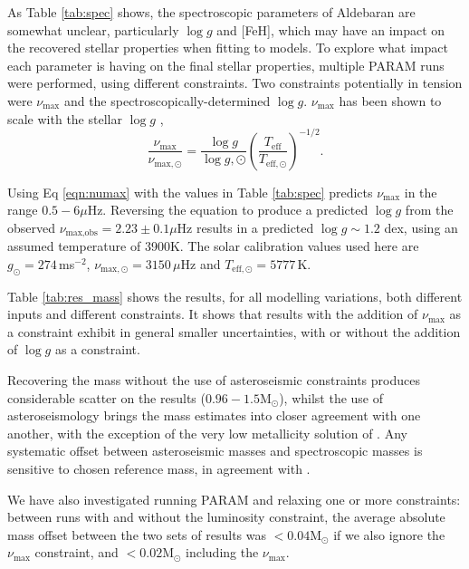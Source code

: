 \documentclass[modern]{aastex61}
\begin{document}
As Table \ref{tab:spec} shows, the spectroscopic parameters of Aldebaran are somewhat unclear, particularly $\log{g}$ and [FeH], which may have an impact on the recovered stellar properties when fitting to models. To explore what impact each parameter is having on the final stellar properties, multiple \textsc{PARAM} runs were performed, using different constraints. Two constraints potentially in tension were $\nu_{\textrm{max}}$ and the spectroscopically-determined $\log{g}$. $\nu_{\textrm{max}}$ has been shown to scale with the stellar $\log{g}$ \citep{Kjeldsen95, 2011A&A...530A.142B},
\begin{equation}
\frac{\nu_{\textrm{max}}}{\nu_{\textrm{max},\odot}}=\frac{\log{g}}{\log{g},\odot}\left(\frac{T_{\textrm{eff}}}{T_{\textrm{eff},\odot}}\right)^{-1/2}.
\label{eqn:numax}
\end{equation}

Using Eq \ref{eqn:numax} with the values in Table \ref{tab:spec} predicts $\nu_{\textrm{max}}$ in the range $0.5-6\mu$Hz. Reversing the equation to produce a predicted $\log{g}$ from the observed $\nu_{\textrm{max,obs}}=2.23\pm0.1\mu$Hz results in a predicted $\log{g}\sim1.2$ dex, using an assumed temperature of 3900K. The solar calibration values used here are $g_{\odot}=274\,$ms$^{-2}$, $\nu_{\textrm{max},\odot}=3150\,\mu$Hz and $T_{\textrm{eff},\odot}=5777\,$K.

Table \ref{tab:res_mass} shows the results, for all modelling variations, both different inputs and different constraints. It shows that results with the addition of $\nu_{\textrm{max}}$ as a constraint exhibit in general smaller uncertainties, with or without the addition of $\log{g}$ as a constraint.

Recovering the mass without the use of asteroseismic constraints produces considerable scatter on the results ($0.96-1.5\textrm{M}_{\odot}$), whilst the use of asteroseismology brings the mass estimates into closer agreement with one another, with the exception of the very low metallicity solution of \cite{2008Massarotti}. Any systematic offset between asteroseismic masses and spectroscopic masses is sensitive to chosen reference mass, in agreement with \cite{2017North}.

We have also investigated running \textsc{PARAM} and relaxing one or more constraints: between runs with and without the luminosity constraint, the average absolute mass offset between the two sets of results was $<0.04\textrm{M}_{\odot}$ if we also ignore the $\nu_{\textrm{max}}$ constraint, and $<0.02\textrm{M}_{\odot}$ including the $\nu_{\textrm{max}}$.
\end{document}
